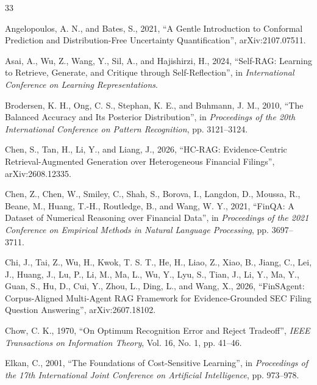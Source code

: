 \begin{thebibliography}{33}
\setlength{\bibsep}{0pt}
\setlength{\itemsep}{0pt}
\setlength{\parsep}{0pt}
\setlength{\bibhang}{2em}

Angelopoulos, A. N., and Bates, S., 2021, ``A Gentle Introduction to Conformal Prediction and Distribution-Free Uncertainty Quantification'', arXiv:2107.07511.

Asai, A., Wu, Z., Wang, Y., Sil, A., and Hajishirzi, H., 2024, ``Self-RAG: Learning to Retrieve, Generate, and Critique through Self-Reflection'', in \emph{International Conference on Learning Representations}.

Brodersen, K. H., Ong, C. S., Stephan, K. E., and Buhmann, J. M., 2010, ``The Balanced Accuracy and Its Posterior Distribution'', in \emph{Proceedings of the 20th International Conference on Pattern Recognition}, pp. 3121--3124.

Chen, S., Tan, H., Li, Y., and Liang, J., 2026, ``HC-RAG: Evidence-Centric Retrieval-Augmented Generation over Heterogeneous Financial Filings'', arXiv:2608.12335.

Chen, Z., Chen, W., Smiley, C., Shah, S., Borova, I., Langdon, D., Moussa, R., Beane, M., Huang, T.-H., Routledge, B., and Wang, W. Y., 2021, ``FinQA: A Dataset of Numerical Reasoning over Financial Data'', in \emph{Proceedings of the 2021 Conference on Empirical Methods in Natural Language Processing}, pp. 3697--3711.

Chi, J., Tai, Z., Wu, H., Kwok, T. S. T., He, H., Liao, Z., Xiao, B., Jiang, C., Lei, J., Huang, J., Lu, P., Li, M., Ma, L., Wu, Y., Lyu, S., Tian, J., Li, Y., Ma, Y., Guan, S., Hu, D., Cui, Y., Zhou, L., Ding, L., and Wang, X., 2026, ``FinSAgent: Corpus-Aligned Multi-Agent RAG Framework for Evidence-Grounded SEC Filing Question Answering'', arXiv:2607.18102.

Chow, C. K., 1970, ``On Optimum Recognition Error and Reject Tradeoff'', \emph{IEEE Transactions on Information Theory}, Vol. 16, No. 1, pp. 41--46.

Elkan, C., 2001, ``The Foundations of Cost-Sensitive Learning'', in \emph{Proceedings of the 17th International Joint Conference on Artificial Intelligence}, pp. 973--978.


\end{thebibliography}
